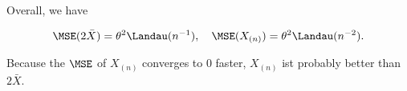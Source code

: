 \begin{solution}
\begin{enumerate}[label = (\alph*)]
\begin{enumerate}[label = \arabic*.]
    \end{enumerate}

    Overall, we have

    \begin{align*}
        \MSE(2 \bar X) = \theta^2 \Landau(n^{-1}),
        \quad
        \MSE(X_{(n)}) = \theta^2 \Landau(n^{-2}).
    \end{align*}

    Because the $\MSE$ of $X_{(n)}$ converges to $0$ faster, $X_{(n)}$ ist probably better than $2 \bar X$.

\end{enumerate}

\end{solution}

